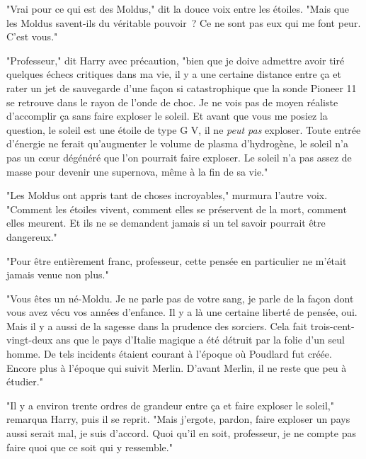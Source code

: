 "Vrai pour ce qui est des Moldus," dit la douce voix entre les étoiles. "Mais que les Moldus savent-ils du véritable pouvoir~? Ce ne sont pas eux qui me font peur. C'est vous."

"Professeur," dit Harry avec précaution, "bien que je doive admettre avoir tiré quelques échecs critiques dans ma vie, il y a une certaine distance entre ça et rater un jet de sauvegarde d'une façon si catastrophique que la sonde Pioneer 11 se retrouve dans le rayon de l'onde de choc. Je ne vois pas de moyen réaliste d'accomplir ça sans faire exploser le soleil. Et avant que vous me posiez la question, le soleil est une étoile de type G V, il ne \emph{peut pas} exploser. Toute entrée d'énergie ne ferait qu'augmenter le volume de plasma d'hydrogène, le soleil n'a pas un cœur dégénéré que l'on pourrait faire exploser. Le soleil n'a pas assez de masse pour devenir une supernova, même à la fin de sa vie."

"Les Moldus ont appris tant de choses incroyables," murmura l'autre voix. "Comment les étoiles vivent, comment elles se préservent de la mort, comment elles meurent. Et ils ne se demandent jamais si un tel savoir pourrait être dangereux."

"Pour être entièrement franc, professeur, cette pensée en particulier ne m'était jamais venue non plus."

"Vous êtes un né-Moldu. Je ne parle pas de votre sang, je parle de la façon dont vous avez vécu vos années d'enfance. Il y a là une certaine liberté de pensée, oui. Mais il y a aussi de la sagesse dans la prudence des sorciers. Cela fait trois-cent-vingt-deux ans que le pays d'Italie magique a été détruit par la folie d'un seul homme. De tels incidents étaient courant à l'époque où Poudlard fut créée. Encore plus à l'époque qui suivit Merlin. D'avant Merlin, il ne reste que peu à étudier."

"Il y a environ trente ordres de grandeur entre ça et faire exploser le soleil," remarqua Harry, puis il se reprit. "Mais j'ergote, pardon, faire exploser un pays aussi serait mal, je suis d'accord. Quoi qu'il en soit, professeur, je ne compte pas faire quoi que ce soit qui y ressemble."

